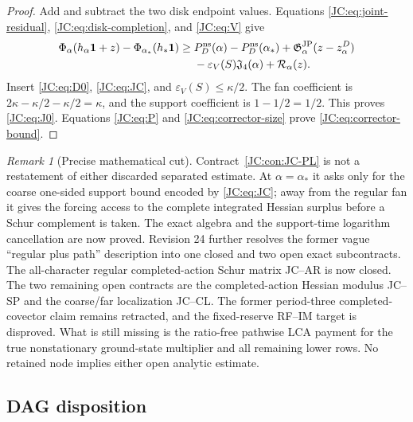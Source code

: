 \documentclass[11pt]{amsart}
\providecommand{\mathscr}{\mathcal}
\numberwithin{equation}{section}
\theoremstyle{definition}
\theoremstyle{remark}
\newtheorem{remark}[theorem]{Remark}
\newcommand{\Jfour}{\mathfrak J_4}
\newcommand{\Gjp}{\mathfrak G^{\rm JP}}
\providecommand{\mathscr}[1]{\mathcal{#1}}
\begin{document}
\begin{proof}
Add and subtract the two disk endpoint values.  Equations
\eqref{JC:eq:joint-residual}, \eqref{JC:eq:disk-completion}, and \eqref{JC:eq:V}
give
\begin{align*}
 \Phi_\alpha(h_\alpha\mathbf1+z)
 -\Phi_{\alpha_*}(h_*\mathbf1)
 \ge{}&P_D^{\rm ns}(\alpha)-P_D^{\rm ns}(\alpha_*)
       +\Gjp_\alpha(z-z_\alpha^D)\\
 &-\varepsilon_V(S)\Jfour(\alpha)+\mathscr R_\alpha(z).
\end{align*}
Insert \eqref{JC:eq:D0}, \eqref{JC:eq:JC}, and
$\varepsilon_V(S)\le\kappa/2$.  The fan coefficient is
$2\kappa-\kappa/2-\kappa/2=\kappa$, and the support coefficient is
$1-1/2=1/2$.  This proves \eqref{JC:eq:J0}.  Equations \eqref{JC:eq:P} and
\eqref{JC:eq:corrector-size} prove \eqref{JC:eq:corrector-bound}.
\end{proof}

\begin{remark}[Precise mathematical cut]
Contract~\ref{JC:con:JC-PL} is not a restatement of either discarded separated
estimate.  At $\alpha=\alpha_*$ it asks only for the coarse one-sided
support bound encoded by \eqref{JC:eq:JC}; away from the regular fan it gives
the forcing access to the complete integrated Hessian surplus before a
Schur complement is taken.  The exact algebra and the support-time
logarithm cancellation are now proved.  Revision 24 further resolves the
former vague ``regular plus path'' description into one closed and two
open exact subcontracts.  The all-character regular completed-action Schur matrix
JC--AR is now closed.  The two remaining open contracts are the
completed-action Hessian modulus JC--SP and the coarse/far localization
JC--CL.  The former period-three completed-covector claim remains
retracted, and the fixed-reserve RF--IM target is disproved.  What is
still missing is the ratio-free
pathwise LCA payment for the true nonstationary ground-state multiplier and
all remaining lower rows.  No retained node implies either open analytic
estimate.
\end{remark}

\subsection{DAG disposition}
\end{document}
